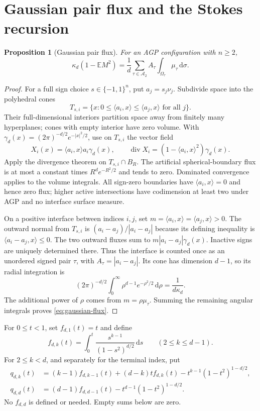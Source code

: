 \documentclass[10pt,reqno]{amsart}
\newtheorem{proposition}[theorem]{Proposition}
\theoremstyle{definition}
\theoremstyle{remark}
\newcommand{\E}{\mathbb E}
\newcommand{\dd}{\,\mathrm d}
\newcommand{\ip}[2]{\langle #1,#2\rangle}
\begin{document}
\section{Gaussian pair flux and the Stokes recursion}\label{sec:stokes}
\begin{proposition}[Gaussian pair flux]\label{prop:gaussian-flux}
For an AGP configuration with $n\ge2$,
\begin{equation}\label{eq:gaussian-flux}
\boxed{\kappa_d(1-\E M^2)=\frac1d\sum_{\tau\in\mathcal A_2}
A_\tau\int_{\Omega_\tau}\mu_\tau\dd\sigma.}
\end{equation}
\end{proposition}
\begin{proof}
For a full sign choice $s\in\{-1,1\}^n$, put $a_j=s_j\nu_j$. Subdivide space into the polyhedral cones
\[
T_{s,i}=\{x:0\le\ip{a_i}{x}\le\ip{a_j}{x}\text{ for all }j\}.
\]
Their full-dimensional interiors partition space away from finitely many hyperplanes; cones with empty interior have zero volume. With $\gamma_d(x)=(2\pi)^{-d/2}e^{-|x|^2/2}$, use on $T_{s,i}$ the vector field
\[
X_i(x)=\ip{a_i}{x}a_i\gamma_d(x),\qquad
\operatorname{div}X_i=(1-\ip{a_i}{x}^2)\gamma_d(x).
\]
Apply the divergence theorem on $T_{s,i}\cap B_R$. The artificial spherical-boundary flux is at most a constant times $R^d e^{-R^2/2}$ and tends to zero. Dominated convergence applies to the volume integrals. All sign-zero boundaries have $\ip{a_i}{x}=0$ and hence zero flux; higher active intersections have codimension at least two under AGP and no interface surface measure.

On a positive interface between indices $i,j$, set $m=\ip{a_i}{x}=\ip{a_j}{x}>0$. The outward normal from $T_{s,i}$ is $(a_i-a_j)/|a_i-a_j|$ because its defining inequality is $\ip{a_i-a_j}{x}\le0$. The two outward fluxes sum to $m|a_i-a_j|\gamma_d(x)$. Inactive signs are uniquely determined there. Thus the interface is counted once as an unordered signed pair $\tau$, with $A_\tau=|a_i-a_j|$. Its cone has dimension $d-1$, so its radial integration is
\[
(2\pi)^{-d/2}\int_0^\infty\rho^{d-1}e^{-\rho^2/2}\dd\rho
=\frac1{d\kappa_d}.
\]
The additional power of $\rho$ comes from $m=\rho\mu_\tau$. Summing the remaining angular integrals proves \eqref{eq:gaussian-flux}.
\end{proof}

For $0\le t<1$, set $f_{d,1}(t)=t$ and define
\begin{equation}\label{eq:fdk}
f_{d,k}(t)=\int_0^t\frac{s^{k-1}}{(1-s^2)^{d/2}}\dd s\qquad(2\le k\le d-1).
\end{equation}
For $2\le k<d$, and separately for the terminal index, put
\begin{align}
q_{d,k}(t)&=(k-1)f_{d,k-1}(t)+(d-k)tf_{d,k}(t)
-t^{k-1}(1-t^2)^{1-d/2},\label{eq:qdk}\\
q_{d,d}(t)&=(d-1)f_{d,d-1}(t)-t^{d-1}(1-t^2)^{1-d/2}.\label{eq:qdd}
\end{align}
No $f_{d,d}$ is defined or needed. Empty sums below are zero.
\end{document}
